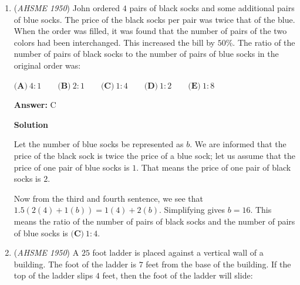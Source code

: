 \begin{enumerate}
 $\textbf{(A)}\ 40\qquad\textbf{(B)}\ 43\qquad\textbf{(C)}\ 29\qquad\textbf{(D)}\ 50\qquad\textbf{(E)}\ \text{None of these}$

 \textbf{Answer: }A



\textbf{Solution}

Let us represent the number of boys $b$, and the number of girls $g$.

 From the first sentence, we get that $2(g-15)=b$.

 From the second sentence, we get $5(b-45)=g-15$.

 Expanding both equations and simplifying, we get $2g-30 = b$ and $5b = g+210$.

 Substituting $b$ for $2g-30$, we get $5(2g-30)=g+210$. Solving for $g$, we get $g = \boxed{\textbf{(A)}\ 40}$.

 


	\item (\textit{AHSME 1950}) John ordered $4$ pairs of black socks and some additional pairs of blue socks. The price of the black socks per pair was twice that of the blue. When the order was filled, it was found that the number of pairs of the two colors had been interchanged. This increased the bill by $50\%$. The ratio of the number of pairs of black socks to the number of pairs of blue socks in the original order was:


 $\textbf{(A)}\ 4:1\qquad\textbf{(B)}\ 2:1\qquad\textbf{(C)}\ 1:4\qquad\textbf{(D)}\ 1:2\qquad\textbf{(E)}\ 1:8$

 \textbf{Answer: }C



\textbf{Solution}

Let the number of blue socks be represented as $b$. We are informed that the price of the black sock is twice the price of a blue sock; let us assume that the price of one pair of blue socks is $1$. That means the price of one pair of black socks is $2$.

 Now from the third and fourth sentence, we see that $1.5(2(4)+1(b))=1(4)+2(b)$. Simplifying gives $b=16$. This means the ratio of the number of pairs of black socks and the number of pairs of blue socks is $\boxed{\textbf{(C)}\ 1:4}$.

 


	\item (\textit{AHSME 1950}) A $25$ foot ladder is placed against a vertical wall of a building. The foot of the ladder is $7$ feet from the base of the building. If the top of the ladder slips $4$ feet, then the foot of the ladder will slide:



\end{enumerate}
